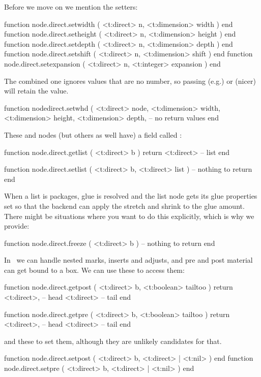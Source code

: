 Before we move on we mention the setters:

\starttyping[option=LUA]
function node.direct.setwidth     ( <t:direct> n, <t:dimension> width     ) end
function node.direct.setheight    ( <t:direct> n, <t:dimension> height    ) end
function node.direct.setdepth     ( <t:direct> n, <t:dimension> depth     ) end
function node.direct.setshift     ( <t:direct> n, <t:dimension> shift     ) end
function node.direct.setexpansion ( <t:direct> n, <t:integer>   expansion ) end
\stoptyping

The combined one ignores values that are no number, so passing (e.g.) 
or (nicer)  will retain the value.

\starttyping[option=LUA]
function nodedirect.setwhd (
    <t:direct>    node,
    <t:dimension> width,
    <t:dimension> height,
    <t:dimension> depth,
    -- no return values
end
\stoptyping

These  and  nodes (but others as well have) a field
called :

\starttyping[option=LUA]
function node.direct.getlist ( <t:direct> b )
    return <t:direct> -- list
end

function node.direct.setlist ( <t:direct> b, <t:direct> list )
    -- nothing to return
end
\stoptyping

When a list is packages, glue is resolved and the list node gets its glue properties
set so that the backend can apply the stretch and shrink to the glue amount. There might
be situations where you want to do this explicitly, which is why we provide:

\starttyping[option=LUA]
function node.direct.freeze ( <t:direct> b )
    -- nothing to return
end
\stoptyping

In \LUAMETATEX\ we can handle nested marks, inserts and adjusts, and
pre and post material can get bound to a box. We can use these to access them:

\starttyping[option=LUA]
function node.direct.getpost ( <t:direct> b, <t:boolean> tailtoo )
    return
        <t:direct>, -- head
        <t:direct>  -- tail
end

function node.direct.getpre ( <t:direct> b, <t:boolean> tailtoo )
    return
        <t:direct>, -- head
        <t:direct>  -- tail
end
\stoptyping

and these to set them, although they are unlikely candidates for that.

\starttyping[option=LUA]
function node.direct.setpost ( <t:direct> b, <t:direct> | <t:nil> ) end
function node.direct.setpre  ( <t:direct> b, <t:direct> | <t:nil> ) end
\stoptyping

